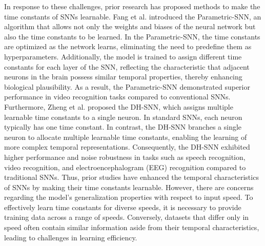 In response to these challenges, prior research has proposed methods to make the time constants of SNNs learnable. 
Fang et al. introduced the Parametric-SNN, an algorithm that allows not only the weights and biases of the neural network but also the time constants to be learned. 
In the Parametric-SNN, the time constants are optimized as the network learns, eliminating the need to predefine them as hyperparameters. 
Additionally, the model is trained to assign different time constants for each layer of the SNN, reflecting the characteristic that adjacent neurons in the brain possess similar temporal properties, thereby enhancing biological plausibility. 
As a result, the Parametric-SNN demonstrated superior performance in video recognition tasks compared to conventional SNNs.
Furthermore, Zheng et al. proposed the DH-SNN, which assigns multiple learnable time constants to a single neuron. 
In standard SNNs, each neuron typically has one time constant. 
In contrast, the DH-SNN branches a single neuron to allocate multiple learnable time constants, enabling the learning of more complex temporal representations. 
Consequently, the DH-SNN exhibited higher performance and noise robustness in tasks such as speech recognition, video recognition, and electroencephalogram (EEG) recognition compared to traditional SNNs.
Thus, prior studies have enhanced the temporal characteristics of SNNs by making their time constants learnable. 
However, there are concerns regarding the model's generalization properties with respect to input speed. 
To effectively learn time constants for diverse speeds, it is necessary to provide training data across a range of speeds. 
Conversely, datasets that differ only in speed often contain similar information aside from their temporal characteristics, leading to challenges in learning efficiency.

